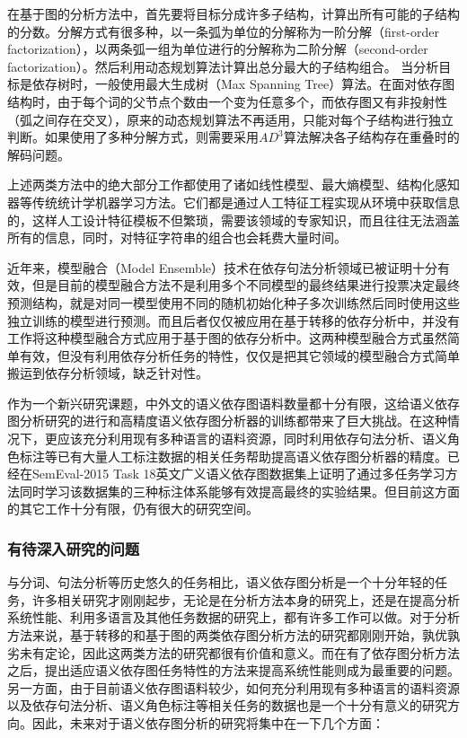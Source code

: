 在基于图的分析方法中，首先要将目标分成许多子结构，计算出所有可能的子结构的分数。分解方式有很多种，以一条弧为单位的分解称为一阶分解（first-order factorization），以两条弧一组为单位进行的分解称为二阶分解（second-order factorization）。然后利用动态规划算法计算出总分最大的子结构组合。
当分析目标是依存树时，一般使用最大生成树（Max Spanning Tree）算法。在面对依存图结构时，由于每个词的父节点个数由一个变为任意多个，而依存图又有非投射性（弧之间存在交叉），原来的动态规划算法不再适用，只能对每个子结构进行独立判断。如果使用了多种分解方式，则需要采用$AD^3$算法解决各子结构存在重叠时的解码问题。

上述两类方法中的绝大部分工作都使用了诸如线性模型、最大熵模型、结构化感知器等传统统计学机器学习方法。它们都是通过人工特征工程实现从环境中获取信息的，这样人工设计特征模板不但繁琐，需要该领域的专家知识，而且往往无法涵盖所有的信息，同时，对特征字符串的组合也会耗费大量时间。

近年来，模型融合（Model Ensemble）技术在依存句法分析领域已被证明十分有效，但是目前的模型融合方法不是利用多个不同模型的最终结果进行投票决定最终预测结构，就是对同一模型使用不同的随机初始化种子多次训练然后同时使用这些独立训练的模型进行预测。而且后者仅仅被应用在基于转移的依存分析中，并没有工作将这种模型融合方式应用于基于图的依存分析中。这两种模型融合方式虽然简单有效，但没有利用依存分析任务的特性，仅仅是把其它领域的模型融合方式简单搬运到依存分析领域，缺乏针对性。

作为一个新兴研究课题，中外文的语义依存图语料数量都十分有限，这给语义依存图分析研究的进行和高精度语义依存图分析器的训练都带来了巨大挑战。在这种情况下，更应该充分利用现有多种语言的语料资源，同时利用依存句法分析、语义角色标注等已有大量人工标注数据的相关任务帮助提高语义依存图分析器的精度。已经在SemEval-2015 Task 18英文广义语义依存图数据集上证明了通过多任务学习方法同时学习该数据集的三种标注体系能够有效提高最终的实验结果。但目前这方面的其它工作十分有限，仍有很大的研究空间。

\subsubsection{有待深入研究的问题}

与分词、句法分析等历史悠久的任务相比，语义依存图分析是一个十分年轻的任务，许多相关研究才刚刚起步，无论是在分析方法本身的研究上，还是在提高分析系统性能、利用多语言及其他任务数据的研究上，都有许多工作可以做。对于分析方法来说，基于转移的和基于图的两类依存图分析方法的研究都刚刚开始，孰优孰劣未有定论，因此这两类方法的研究都很有价值和意义。而在有了依存图分析方法之后，提出适应语义依存图任务特性的方法来提高系统性能则成为最重要的问题。另一方面，由于目前语义依存图语料较少，如何充分利用现有多种语言的语料资源以及依存句法分析、语义角色标注等相关任务的数据也是一个十分有意义的研究方向。因此，未来对于语义依存图分析的研究将集中在一下几个方面：

